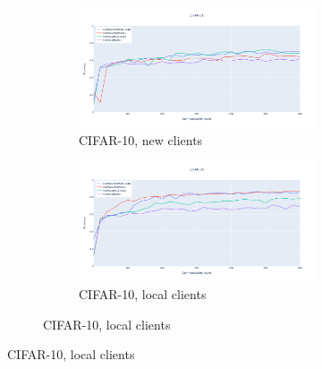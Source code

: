 \documentclass[oneside,a4paper,14pt]{extreport}
\begin{document}
\begin{figure}
    \centering
    \begin{subfigure}{\textwidth}
        \centering
        \begin{subfigure}{.5\textwidth}
            \centering
            \includegraphics[width=\linewidth]{./tab_img/cifar_meta_new.png}
            \caption{CIFAR-10, new clients}
            \label{fig:cifar_meta_new}
        \end{subfigure}%
        \begin{subfigure}{.5\textwidth}
            \centering
            \includegraphics[width=\linewidth]{./tab_img/cifar_meta_old.png}
            \caption{CIFAR-10, local clients}
            \label{fig:cifar_meta_old}
        \end{subfigure}
    \end{subfigure}


\end{figure}
\end{document}
